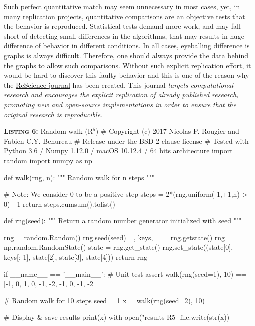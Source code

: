 \documentclass[a4paper,11pt]{article}
\begin{document}
Such perfect quantitative match may seem unnecessary in most cases, yet, in
many replication projects, quantitative comparisons are an objective tests that
the behavior is reproduced. Statistical tests demand more work, and may fall
short of detecting small differences in the algorithms, that may results in
huge difference of behavior in different conditions. In all cases, eyeballing
difference is graphs is always difficult. Therefore, one should always provide
the data behind the graphs to allow such comparisons. Without such explicit
replication effort, it would be hard to discover this faulty behavior and this
is one of the reason why the \href{https://rescience.github.io}{ReScience
  journal} has been created. This journal {\em targets computational research and
encourages the explicit replication of already published research, promoting
new and open-source implementations in order to ensure that the original
research is reproducible}.

\noindent \begin{minipage}[c]{\linewidth}
\begin{code}{\textbf{\textsc{Listing 6:}} Random walk (R$^5$)}
# Copyright (c) 2017 Nicolas P. Rougier and Fabien C.Y. Benureau
# Release under the BSD 2-clause license
# Tested with Python 3.6 / Numpy 1.12.0 / macOS 10.12.4 / 64 bits architecture
import random
import numpy as np

def walk(rng, n):
    """ Random walk for n steps """
	
    # Note: We consider 0 to be a positive step
    steps = 2*(rng.uniform(-1,+1,n) > 0) - 1
    return steps.cumsum().tolist()

def rng(seed):
    """ Return a random number generator initialized with seed """ 
    
    rng = random.Random()
    rng.seed(seed)
    _, keys, _ = rng.getstate()
    rng = np.random.RandomState()
    state = rng.get_state()
    rng.set_state((state[0], keys[:-1], state[2], state[3], state[4]))
    return rng

if __name__ == '__main__':
    # Unit test
    assert walk(rng(seed=1), 10) == [-1, 0, 1, 0, -1, -2, -1, 0, -1, -2]

    # Random walk for 10 steps
    seed = 1
    x = walk(rng(seed=2), 10)

    # Display & save results
    print(x)
    with open("results-R5-%
        file.write(str(x))
\end{code}
\end{minipage}
\end{document}
